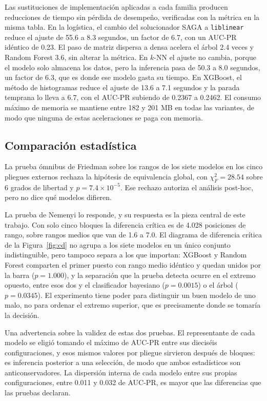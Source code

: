 \documentclass[pdflatex,sn-mathphys-num]{sn-jnl}
\begin{document}
Las sustituciones de implementación aplicadas a cada familia producen reducciones de tiempo sin pérdida de desempeño, verificadas con la métrica en la misma tabla. En la logística, el cambio del solucionador SAGA \cite{bib_saga} a \texttt{liblinear} reduce el ajuste de 55.6 a 8.3 segundos, un factor de 6.7, con un AUC-PR idéntico de 0.23. El paso de matriz dispersa a densa acelera el árbol 2.4 veces y Random Forest 3.6, sin alterar la métrica. En $k$-NN el ajuste no cambia, porque el modelo solo almacena los datos, pero la inferencia pasa de 50.3 a 8.0 segundos, un factor de 6.3, que es donde ese modelo gasta su tiempo. En XGBoost, el método de histogramas reduce el ajuste de 13.6 a 7.1 segundos y la parada temprana lo lleva a 6.7, con el AUC-PR subiendo de 0.2367 a 0.2462. El consumo máximo de memoria se mantiene entre 182 y 201 MB en todas las variantes, de modo que ninguna de estas aceleraciones se paga con memoria.

\subsection{Comparación estadística}

La prueba ómnibus de Friedman \cite{bib_friedman} sobre los rangos de los siete modelos en los cinco pliegues externos rechaza la hipótesis de equivalencia global, con $\chi^2_F = 28.54$ sobre 6 grados de libertad y $p = 7.4\times10^{-5}$. Ese rechazo autoriza el análisis post-hoc, pero no dice qué modelos difieren.

La prueba de Nemenyi \cite{bib_nemenyi,bib_demsar} lo responde, y su respuesta es la pieza central de este trabajo. Con solo cinco bloques la diferencia crítica es de 4.028 posiciones de rango, sobre rangos medios que van de 1.6 a 7.0. El diagrama de diferencia crítica de la Figura~\ref{fig:cd} no agrupa a los siete modelos en un único conjunto indistinguible, pero tampoco separa a los que importan: XGBoost y Random Forest comparten el primer puesto con rango medio idéntico y quedan unidos por la barra ($p = 1.000$), y la separación que la prueba detecta ocurre en el extremo opuesto, entre esos dos y el clasificador bayesiano ($p = 0.0015$) o el árbol ($p = 0.0345$). El experimento tiene poder para distinguir un buen modelo de uno malo, no para ordenar el extremo superior, que es precisamente donde se tomaría la decisión.

Una advertencia sobre la validez de estas dos pruebas. El representante de cada modelo se eligió tomando el máximo de AUC-PR entre sus dieciséis configuraciones, y esos mismos valores por pliegue sirvieron después de bloques: es inferencia posterior a una selección, de modo que ambos estadísticos son anticonservadores. La dispersión interna de cada modelo entre sus propias configuraciones, entre 0.011 y 0.032 de AUC-PR, es mayor que las diferencias que las pruebas declaran.
\end{document}
